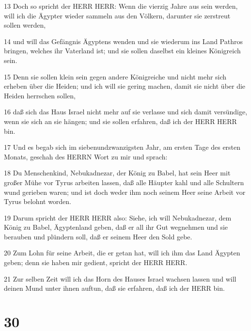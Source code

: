 \par 13 Doch so spricht der HERR HERR: Wenn die vierzig Jahre aus sein werden, will ich die Ägypter wieder sammeln aus den Völkern, darunter sie zerstreut sollen werden,
\par 14 und will das Gefängnis Ägyptens wenden und sie wiederum ins Land Pathros bringen, welches ihr Vaterland ist; und sie sollen daselbst ein kleines Königreich sein.
\par 15 Denn sie sollen klein sein gegen andere Königreiche und nicht mehr sich erheben über die Heiden; und ich will sie gering machen, damit sie nicht über die Heiden herrschen sollen,
\par 16 daß sich das Haus Israel nicht mehr auf sie verlasse und sich damit versündige, wenn sie sich an sie hängen; und sie sollen erfahren, daß ich der HERR HERR bin.
\par 17 Und es begab sich im siebenundzwanzigsten Jahr, am ersten Tage des ersten Monats, geschah des HERRN Wort zu mir und sprach:
\par 18 Du Menschenkind, Nebukadnezar, der König zu Babel, hat sein Heer mit großer Mühe vor Tyrus arbeiten lassen, daß alle Häupter kahl und alle Schultern wund gerieben waren; und ist doch weder ihm noch seinem Heer seine Arbeit vor Tyrus belohnt worden.
\par 19 Darum spricht der HERR HERR also: Siehe, ich will Nebukadnezar, dem König zu Babel, Ägyptenland geben, daß er all ihr Gut wegnehmen und sie berauben und plündern soll, daß er seinem Heer den Sold gebe.
\par 20 Zum Lohn für seine Arbeit, die er getan hat, will ich ihm das Land Ägypten geben; denn sie haben mir gedient, spricht der HERR HERR.
\par 21 Zur selben Zeit will ich das Horn des Hauses Israel wachsen lassen und will deinen Mund unter ihnen auftun, daß sie erfahren, daß ich der HERR bin.

\chapter{30}

